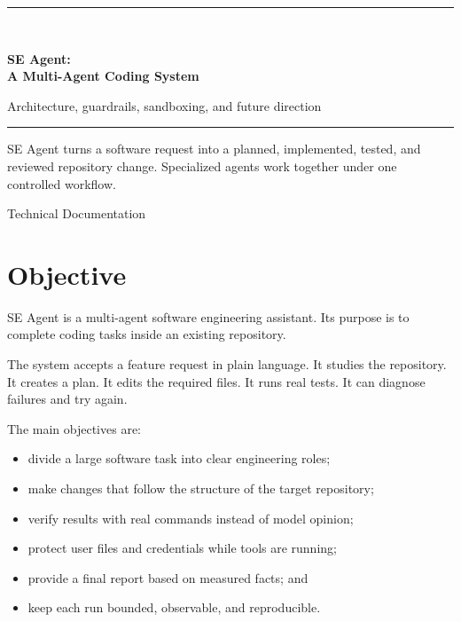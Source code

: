 \documentclass[11pt,a4paper]{article}
\begin{document}
\begin{titlepage}
  \centering
  \vspace*{2.4cm}

  {\color{SEBlue}\rule{0.82\textwidth}{2pt}}\\[1.2cm]
  {\Huge\bfseries\color{SENavy} SE Agent:\\[0.25cm]
  A Multi-Agent Coding System\par}

  \vspace{0.8cm}
  {\Large\color{SEGray}
  Architecture, guardrails, sandboxing, and future direction\par}

  \vspace{1.2cm}
  {\color{SEBlue}\rule{0.82\textwidth}{2pt}}

  \vfill
  \begin{minipage}{0.76\textwidth}
    \centering
    \color{SEGray}
    SE Agent turns a software request into a planned, implemented,
    tested, and reviewed repository change. Specialized agents work
    together under one controlled workflow.
  \end{minipage}

  \vfill
  {\large\color{SENavy}Technical Documentation}
\end{titlepage}

\tableofcontents
\clearpage

\section{Objective}

SE Agent is a multi-agent software engineering assistant. Its purpose is to
complete coding tasks inside an existing repository.

The system accepts a feature request in plain language. It studies the
repository. It creates a plan. It edits the required files. It runs real
tests. It can diagnose failures and try again.

The main objectives are:

\begin{itemize}
  \item divide a large software task into clear engineering roles;
  \item make changes that follow the structure of the target repository;
  \item verify results with real commands instead of model opinion;
  \item protect user files and credentials while tools are running;
  \item provide a final report based on measured facts; and
  \item keep each run bounded, observable, and reproducible.
\end{itemize}
\end{document}
